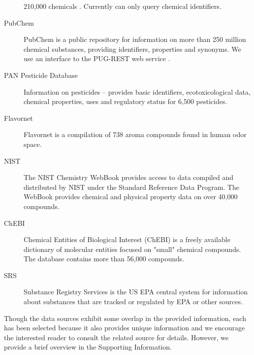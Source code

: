 \documentclass[article]{jss}
\begin{document}
\begin{description}
{	210,000 chemicals
	\citep{Ertl_Patiny_Sander_Rufener_Zasso_2015}. Currently
	 can only query chemical identifiers.}
\item[PubChem]{\citep{Kim_2016} PubChem is a public repository for
    information on more than 250 million chemical substances, providing identifiers,
    properties and synonyms. We use an interface to the PUG-REST web
    service \citep{Kim_Thiessen_Bolton_Bryant_2015}.}
\item[PAN Pesticide Database]{ \citep{pan} Information on pesticides --
	provides basic identifiers, ecotoxicological data, chemical
	properties, uses and regulatory status for 6,500 pesticides.}
\item[Flavornet]{\citep{flavornet} Flavornet is a compilation of 738 aroma compounds found in human odor space.}
\item[NIST]{\citep{nist} The NIST Chemistry WebBook provides access to data compiled and distributed by NIST under the Standard Reference Data Program. The WebBook provides chemical and physical property data on over 40,000 compounds.}
\item[ChEBI]{\citep{chebi} Chemical Entities of Biological Interest (ChEBI) is a freely available dictionary of molecular entities focused on "small" chemical compounds. The database contains more than 56,000 compounds.}
\item[SRS]{\citep{srs} Substance Registry Services is the US EPA central system for information about substances that are tracked or regulated by EPA or other sources.}

\end{description}

Though the data sources exhibit some overlap in the provided
information, each has been selected because it also provides unique
information and we encourage the interested reader to consult the
related source for details.  However, we provide a brief overview in
the Supporting Information.
\end{document}
